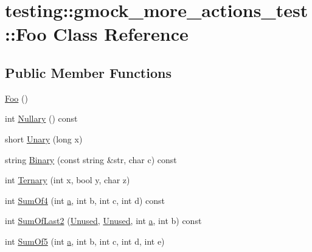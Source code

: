 \hypertarget{classtesting_1_1gmock__more__actions__test_1_1_foo}{}\section{testing\+:\+:gmock\+\_\+more\+\_\+actions\+\_\+test\+:\+:Foo Class Reference}
\label{classtesting_1_1gmock__more__actions__test_1_1_foo}
\subsection*{Public Member Functions}
\begin{DoxyCompactItemize}
\item 
\hyperlink{classtesting_1_1gmock__more__actions__test_1_1_foo_ad2603a65b94e019c75f4227787b9177e}{Foo} ()
\item 
int \hyperlink{classtesting_1_1gmock__more__actions__test_1_1_foo_ab96640ab521acae74bd620ca8ff5a809}{Nullary} () const 
\item 
short \hyperlink{classtesting_1_1gmock__more__actions__test_1_1_foo_a68d2b46d6cc7d51979b0254940af6090}{Unary} (long x)
\item 
string \hyperlink{classtesting_1_1gmock__more__actions__test_1_1_foo_acb4ce6889ca41321d6f598d0a0111905}{Binary} (const string \&str, char c) const 
\item 
int \hyperlink{classtesting_1_1gmock__more__actions__test_1_1_foo_afc5b86988210ad598fa3a2a9822297e4}{Ternary} (int x, bool y, char z)
\item 
int \hyperlink{classtesting_1_1gmock__more__actions__test_1_1_foo_aedb314b0f2baa25817b98c1b3826ff00}{Sum\+Of4} (int \hyperlink{_07copy_08_2_read_camera_model_8m_a551a3d351eadcc0b9b1a2f24f0fb5ea0}{a}, int b, int c, int d) const 
\item 
int \hyperlink{classtesting_1_1gmock__more__actions__test_1_1_foo_a1024d41fae87bf011a7a8e1b4cd5f4d3}{Sum\+Of\+Last2} (\hyperlink{namespacetesting_a603e329ec0263ebfcf16f712810bd511}{Unused}, \hyperlink{namespacetesting_a603e329ec0263ebfcf16f712810bd511}{Unused}, int \hyperlink{_07copy_08_2_read_camera_model_8m_a551a3d351eadcc0b9b1a2f24f0fb5ea0}{a}, int b) const 
\item 
int \hyperlink{classtesting_1_1gmock__more__actions__test_1_1_foo_a55fb0cdc224c450f401e0fea4f979512}{Sum\+Of5} (int \hyperlink{_07copy_08_2_read_camera_model_8m_a551a3d351eadcc0b9b1a2f24f0fb5ea0}{a}, int b, int c, int d, int e)
\item 

\end{DoxyCompactItemize}
